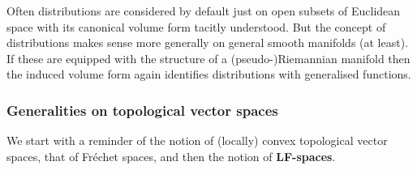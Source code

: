             Often distributions are considered by default just on open subsets of Euclidean space with its canonical volume form tacitly understood. But the concept of distributions makes sense more generally on general smooth manifolds (at least). If these are equipped with the structure of a (pseudo-)Riemannian manifold then the induced volume form again identifies distributions with generalised functions.
            
            \subsubsection{Generalities on topological vector spaces}
                We start with a reminder of the notion of (locally) convex topological vector spaces, that of Fr\'echet spaces, and then the notion of \textbf{LF-spaces}.
                
